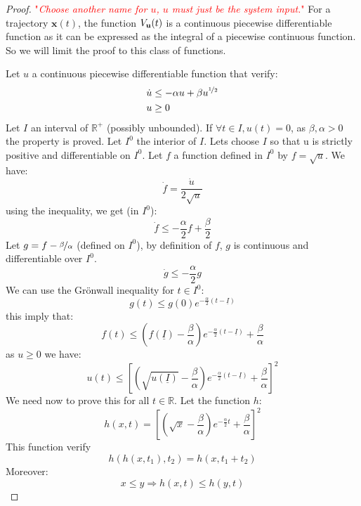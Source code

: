 \documentclass{article}
\theoremstyle{named}
\newcommand{\vect}[1]{\ensuremath{ \mathbf{#1}}}
\newcommand\comment[1]{\textcolor{red}{"\textit{#1}"}}
\begin{document}
\begin{proof}
\newcommand{\tI}{\underline{I}}
\newcommand{\tIs}{\overline{I}}
\comment{Choose another name for $u$, $u$ must just be the system input.}
For a trajectory $\vect{x}(t)$, the function $\Vu(t)$ is a continuous piecewise differentiable function as it can be expressed as the integral of a piecewise continuous function.
So we will limit the proof to this class of functions.

Let $u$ a continuous piecewise differentiable function that verify:
\begin{align*}
\dot{u} &\leq -\alpha u + \beta u^{\nicefrac{1}{2}}\\
u & \geq 0
\end{align*}
Let $I$ an interval of $\mathbb{R}^+$ (possibly unbounded).
If $\forall t\in I, u(t)=0$, as $\beta,\alpha>0$ the property is proved.
Let $I^0$ the interior of $I$.
Lets choose $I$ so that u is strictly positive and differentiable on $I^0$.
Let $f$ a function defined in $I^0$ by $f = \sqrt{u}$.
We have:
$$\dot{f} = \frac{\dot{u}}{2\sqrt{u}}$$
using the inequality, we get (in $I^0$):
$$\dot{f} \leq -\frac{\alpha}{2} f + \frac{\beta}{2}$$
Let $g = f- \nicefrac{\beta}{\alpha}$ (defined on $I^0$), 
by definition of $f$, $g$ is continuous and differentiable over $I^0$.
$$\dot{g} \leq -\frac{\alpha}{2} g$$
We can use the Gr\"onwall inequality for $t \in I^0$:
$$g(t) \leq g(0) e^{-\frac{\alpha}{2} (t-\tI)}$$
this imply that:
$$f(t) \leq (f(\tI)- \frac{\beta}{\alpha}) e^{-\frac{\alpha}{2} (t-\tI)} + \frac{\beta}{\alpha}$$
as $u \geq 0$ we have:
$$ u(t) \leq  \left[ (\sqrt{u(\tI)} - \frac{\beta}{\alpha}) e^{-\frac{\alpha}{2} (t-\tI)} + \frac{\beta}{\alpha} \right] ^2$$
We need now to prove this for all $t \in \mathbb{R}$.
Let the function $h$:
$$h(x,t) = \left[ (\sqrt{x} - \frac{\beta}{\alpha}) e^{-\frac{\alpha}{2}t} + \frac{\beta}{\alpha} \right] ^2$$
This function verify
\begin{equation} \label{eq:h_compo}
h(h(x,t_1),t_2) = h(x,t_1+t_2)
\end{equation}
Moreover:
\begin{equation} \label{eq:h_monot}
x \leq y \Rightarrow h(x,t) \leq h(y,t)
\end{equation}


\end{proof}
\end{document}
